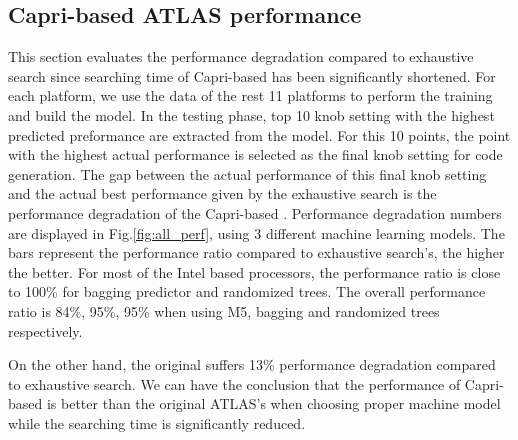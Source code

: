   \subsection{Capri-based ATLAS performance}
  \label{sec:capri_atlas_performance}
  This section evaluates the performance degradation compared to exhaustive
  search since searching time of Capri-based \atl has been significantly
  shortened. For each platform, we use the data of the rest 11 platforms to
  perform the training and build the model. In the testing phase, top 10
  knob setting with the highest predicted preformance are extracted from the
  model. For this 10 points, the point with the highest actual performance is
  selected as the final knob setting for code generation. The gap between the
  actual performance of this final knob setting and the actual best performance
  given by the exhaustive search is the performance degradation of the
  Capri-based \atl. Performance degradation numbers are displayed in
  Fig.\ref{fig:all_perf}, using 3 different machine learning models. The bars
  represent the performance ratio compared to exhaustive search's, the higher
  the better. For most of the Intel based processors, the performance ratio is
  close to 100\% for bagging predictor and randomized trees. The overall
  performance ratio is 84\%, 95\%, 95\% when using M5, bagging and randomized
  trees respectively.

  On the other hand, the original \atl suffers 13\% performance degradation
  compared to exhaustive search. We can have the conclusion that the
  performance of Capri-based \atl is better than the original ATLAS's when
  choosing proper machine model while the searching time is significantly
  reduced.

